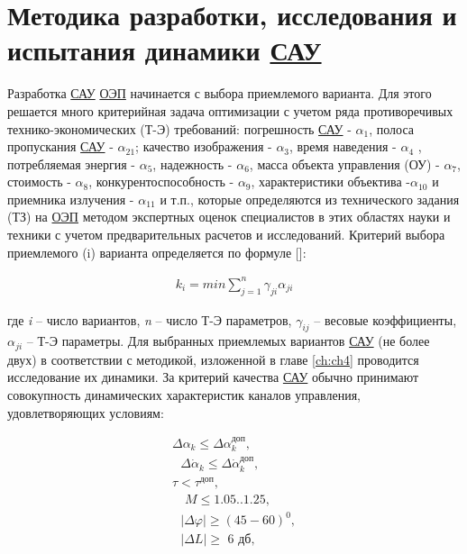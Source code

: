 \section{Методика разработки, исследования и испытания динамики \hyperref[acroSAU]{САУ}} \label{sec:ch2/sec1-}


Разработка \hyperref[acroSAU]{САУ} \hyperref[acroEOS]{ОЭП} начинается с выбора приемлемого варианта. Для этого решается много критерийная задача оптимизации с учетом ряда противоречивых технико-экономических (Т-Э) требований: погрешность \hyperref[acroSAU]{САУ} - $\alpha_{1}$, полоса пропускания \hyperref[acroSAU]{САУ} - $\alpha_{21}$; качество изображения - $\alpha_{3}$, время наведения - $\alpha_{4}$ , потребляемая энергия - $\alpha_{5}$, надежность - $\alpha_{6}$, масса объекта управления (ОУ) - $\alpha_{7}$, стоимость - $\alpha_{8}$, конкурентоспособность - $\alpha_{9}$, характеристики объектива -$\alpha_{10}$ и приемника излучения - $\alpha_{11}$ и т.п., которые определяются из технического задания (ТЗ) на \hyperref[acroEOS]{ОЭП} методом экспертных оценок специалистов в этих областях науки и техники с учетом предварительных расчетов и исследований. Критерий выбора приемлемого (i) варианта определяется по формуле []:

\begin{equation}
\label{eq:p2:1}
\begin{alignedat}{2}
k_i=min\sum_{j=1}^n{\gamma _{ji}\alpha _{ji}}
\end{alignedat}
\end{equation}

где \textit{i} – число вариантов, \textit{n} – число Т-Э параметров, $\gamma_{ij}$ – весовые коэффициенты, $\alpha_{ji}$ – Т-Э параметры. Для выбранных приемлемых вариантов \hyperref[acroSAU]{САУ} (не более двух) в соответствии с методикой, изложенной в главе \ref{ch:ch4} проводится исследование их динамики. За критерий качества \hyperref[acroSAU]{САУ} обычно принимают совокупность динамических характеристик каналов управления, удовлетворяющих условиям:

\begin{equation}
\label{eq:p2:2}
\begin{alignedat}{2}
\varDelta \alpha _k\leqslant \varDelta \alpha _{k}^{\textit{доп}},
\\
\,\,\,\,\varDelta \dot{\alpha}_k\leqslant \varDelta \dot{\alpha}_{k}^{\textit{доп}},
\\
\tau < \tau^\textit{доп},
\\
\,\,\,\,\,\,M\leqslant \text{1.05..1.25,}
\\
\,\,\,\,\left| \left. \varDelta \varphi \right| \right. \geqslant \left( 45-60 \right) ^0,
\\
\,\,\,\,\left| \left. \varDelta L \right|\geqslant \,\,\textit{6 дб}, \right. 
\end{alignedat}
\end{equation}

